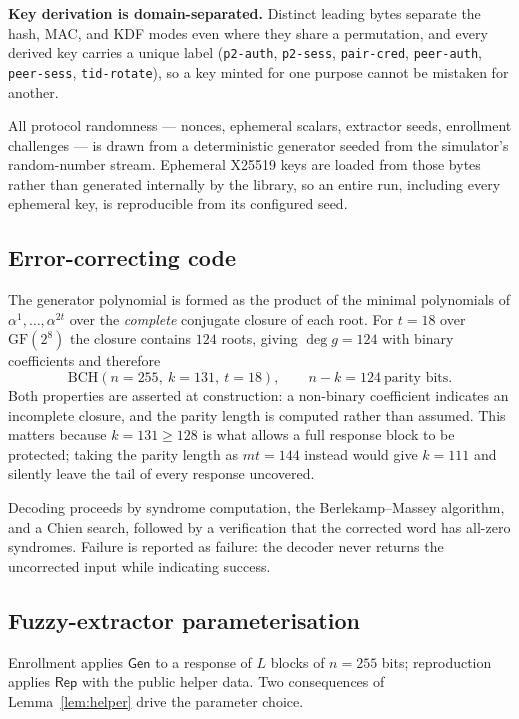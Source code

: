 \documentclass[11pt,a4paper]{article}
\begin{document}
\textbf{Key derivation is domain-separated.} Distinct leading bytes separate the
hash, MAC, and KDF modes even where they share a permutation, and every derived
key carries a unique label (\texttt{p2-auth}, \texttt{p2-sess}, \texttt{pair-cred},
\texttt{peer-auth}, \texttt{peer-sess}, \texttt{tid-rotate}), so a key minted for
one purpose cannot be mistaken for another.

All protocol randomness --- nonces, ephemeral scalars, extractor seeds, enrollment
challenges --- is drawn from a deterministic generator seeded from the simulator's
random-number stream. Ephemeral X25519 keys are loaded from those bytes rather
than generated internally by the library, so an entire run, including every
ephemeral key, is reproducible from its configured seed.

\subsection{Error-correcting code}

The generator polynomial is formed as the product of the minimal polynomials of
$\alpha^1,\dots,\alpha^{2t}$ over the \emph{complete} conjugate closure of each
root. For $t=18$ over $\mathrm{GF}(2^8)$ the closure contains $124$ roots, giving
$\deg g = 124$ with binary coefficients and therefore
%
\begin{equation}
\mathrm{BCH}(n{=}255,\ k{=}131,\ t{=}18), \qquad n-k = 124 \ \text{parity bits}.
\end{equation}
%
Both properties are asserted at construction: a non-binary coefficient indicates
an incomplete closure, and the parity length is computed rather than assumed. This
matters because $k = 131 \ge 128$ is what allows a full response block to be
protected; taking the parity length as $mt = 144$ instead would give $k = 111$ and
silently leave the tail of every response uncovered.

Decoding proceeds by syndrome computation, the Berlekamp--Massey algorithm, and a
Chien search, followed by a verification that the corrected word has all-zero
syndromes. Failure is reported as failure: the decoder never returns the
uncorrected input while indicating success.

\subsection{Fuzzy-extractor parameterisation}

Enrollment applies $\mathsf{Gen}$ to a response of $L$ blocks of $n=255$ bits;
reproduction applies $\mathsf{Rep}$ with the public helper data. Two consequences
of Lemma~\ref{lem:helper} drive the parameter choice.
\end{document}
